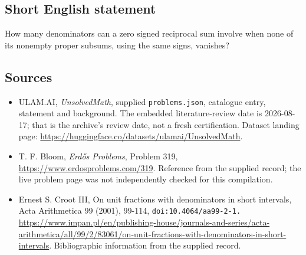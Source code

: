 \documentclass[11pt,a4paper]{article}
\begin{document}
\subsection{Short English statement}

How many denominators can a zero signed reciprocal sum involve when none of its nonempty proper subsums, using the same signs, vanishes?

\subsection{Sources}

{\small

\begin{itemize}

\item[\hypertarget{source:statement:1}{S1}] ULAM.AI, \emph{UnsolvedMath}, supplied \texttt{problems.json}, catalogue entry, statement and background. The embedded literature-review date is 2026-08-17; that is the archive’s review date, not a fresh certification. Dataset landing page: \url{https://huggingface.co/datasets/ulamai/UnsolvedMath}.

\item[\hypertarget{source:statement:2}{S2}] T. F. Bloom, \emph{Erdős Problems}, Problem 319, \url{https://www.erdosproblems.com/319}. Reference from the supplied record; the live problem page was not independently checked for this compilation.

\item[\hypertarget{source:statement:3}{S3}] Ernest S. Croot III, On unit fractions with denominators in short intervals, Acta Arithmetica 99 (2001), 99-114, \nolinkurl{doi:10.4064/aa99-2-1.} \url{https://www.impan.pl/en/publishing-house/journals-and-series/acta-arithmetica/all/99/2/83061/on-unit-fractions-with-denominators-in-short-intervals}. Bibliographic information from the supplied record.

\end{itemize}

}

\label{end:statement}
\end{document}
